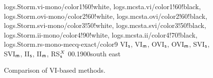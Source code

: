 
\begin{figure*}[!htp]
	\centering
	{
		logs.Storm.vi-mono/color1!60!white,
		logs.mcsta.vi/color1!60!black,
		logs.Storm.ovi-mono/color2!60!white,
		logs.mcsta.ovi/color2!60!black,
		logs.Storm.svi-mono/color3!50!white,
		logs.mcsta.svi/color3!50!black,
		logs.Storm.ii-mono/color4!90!white,
		logs.mcsta.ii/color4!70!black,
		logs.Storm.rs-mono-mecq-exact/color9
	}
	{
		VI$_\textsf{s}$,
		VI$_\textsf{m}$, 
		OVI$_\textsf{s}$,
		OVI$_\textsf{m}$,  
		SVI$_\textsf{s}$,
		SVI$_\textsf{m}$,  
		II$_\textsf{s}$, 
		II$_\textsf{m}$, 
		RS$_\textsf{s}^{X}$}
	{0}{\numcommunity}{0.1}{900}{south east}
	
	
	
	\caption{Comparison of VI-based methods.}
	\label{fig:VI-algo}
\end{figure*}
%


